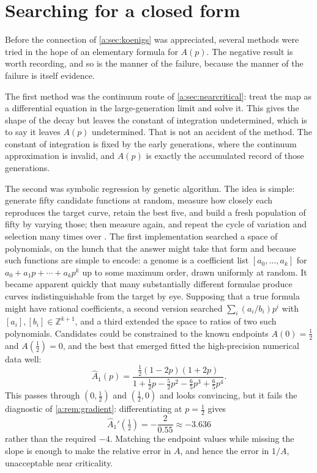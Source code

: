 \section{Searching for a closed form}
\label{a:sec:GA}

Before the connection of \cref{a:sec:koenigs} was appreciated, several methods were
tried in the hope of an elementary formula for $A(p)$. The negative result is worth
recording, and so is the manner of the failure, because the manner of the failure
is itself evidence.

The first method was the continuum route of \cref{a:sec:nearcritical}: treat the map
as a differential equation in the large-generation limit and solve it. This gives
the shape of the decay but leaves the constant of integration undetermined, which
is to say it leaves $A(p)$ undetermined. That is not an accident of the method. The
constant of integration is fixed by the early generations, where the continuum
approximation is invalid, and $A(p)$ is exactly the accumulated record of those
generations.

The second was symbolic regression by genetic algorithm. The idea is simple:
generate fifty candidate functions at random, measure how closely each reproduces
the target curve, retain the best five, and build a fresh population of fifty by
varying those; then measure again, and repeat the cycle of variation and selection
many times over \cite{stanley2002evolving,cohen2024physics}. The first
implementation searched a space of polynomials, on the hunch that the answer might
take that form and because such functions are simple to encode: a genome is a
coefficient list $[a_0,\dots,a_k]$ for $a_0+a_1p+\cdots+a_kp^k$ up to some maximum
order, drawn uniformly at random. It became apparent quickly that many
substantially different formulae produce curves indistinguishable from the target
by eye. Supposing that a true formula might have rational coefficients, a second
version searched $\sum_i(a_i/b_i)p^i$ with $[a_i],[b_i]\in\mathbb Z^{k+1}$, and a
third extended the space to ratios of two such polynomials. Candidates could be
constrained to the known endpoints $A(0)=\tfrac12$ and $A(\tfrac12)=0$, and the
best that emerged fitted the high-precision numerical data well:
\begin{equation}
\label{a:eq:A1hat}
\hat A_1(p) = \frac{\tfrac12(1-2p)(1+2p)}
{1+\tfrac12p-\tfrac52p^2-\tfrac65p^3+\tfrac65p^4} .
\end{equation}
This passes through $(0,\tfrac12)$ and $(\tfrac12,0)$ and looks convincing, but it
fails the diagnostic of \cref{a:rem:gradient}: differentiating at $p=\tfrac12$ gives
\begin{equation*}
\hat A_1'(\tfrac12) = -\frac{2}{0.55}\approx-3.636
\end{equation*}
rather than the required $-4$. Matching the endpoint values while missing the slope
is enough to make the relative error in $A$, and hence the error in $1/A$,
unacceptable near criticality.

